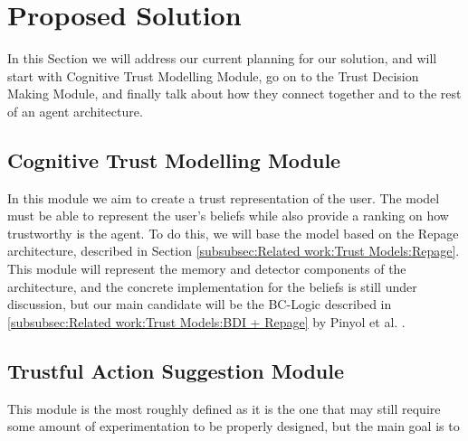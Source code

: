 \section{Proposed Solution}
\label{sec:Solution}
In this Section we will address our current planning for our solution, and will start with Cognitive Trust Modelling Module, go on to the Trust Decision Making Module, and finally talk about how they connect together and to the rest of an agent architecture.


\subsection{Cognitive Trust Modelling Module}
\label{subsec:Solution:Trust Assessment Module}
In this module we aim to create a trust representation of the user. The model must be able to represent the user's beliefs while also provide a ranking on how trustworthy is the agent. To do this, we will base the model based on the Repage architecture, described in Section \ref{subsubsec:Related work:Trust Models:Repage}. This module will represent the memory and detector components of the architecture, and the concrete implementation for the beliefs is still under discussion, but our main candidate will be the BC-Logic described in \ref{subsubsec:Related work:Trust Models:BDI + Repage} by Pinyol et al. \cite{Pinyol2009}.



\subsection{Trustful Action Suggestion Module}
\label{subsec:Solution:Trust Decision Making Module}
This module is the most roughly defined as it is the one that may still require some amount of experimentation to be properly designed, but the main goal is to 
